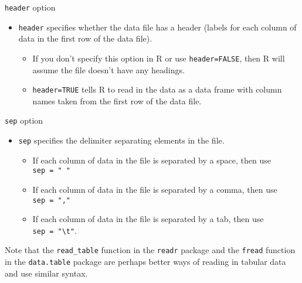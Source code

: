 \begin{frame}[fragile]{\texttt{header} option}
\protect\hypertarget{header-option}{}

\begin{itemize}
\tightlist
\item
  \texttt{header} specifies whether the data file has a header (labels
  for each column of data in the first row of the data file).

  \begin{itemize}
  \tightlist
  \item
    If you don't specify this option in R or use \texttt{header=FALSE},
    then R will assume the file doesn't have any headings.
  \item
    \texttt{header=TRUE} tells R to read in the data as a data frame
    with column names taken from the first row of the data file.
  \end{itemize}
\end{itemize}

\end{frame}

\begin{frame}[fragile]{\texttt{sep} option}
\protect\hypertarget{sep-option}{}

\begin{itemize}
\tightlist
\item
  \texttt{sep} specifies the delimiter separating elements in the file.

  \begin{itemize}
  \tightlist
  \item
    If each column of data in the file is separated by a space, then use
    \texttt{sep\ =\ "\ "}
  \item
    If each column of data in the file is separated by a comma, then use
    \texttt{sep\ =\ ","}
  \item
    If each column of data in the file is separated by a tab, then use
    \texttt{sep\ =\ "\textbackslash{}t"}.
  \end{itemize}
\end{itemize}

Note that the \texttt{read\_table} function in the \texttt{readr}
package and the \texttt{fread} function in the \texttt{data.table}
package are perhaps better ways of reading in tabular data and use
similar syntax.

\end{frame}

